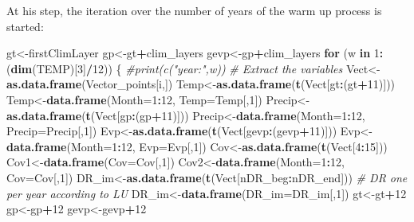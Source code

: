 \documentclass[
  10pt,
  b5paper,
]{book}
\newenvironment{Shaded}{\begin{snugshade}}{\end{snugshade}}
\newcommand{\CommentTok}[1]{\textcolor[rgb]{0.56,0.35,0.01}{\textit{#1}}}
\newcommand{\ControlFlowTok}[1]{\textcolor[rgb]{0.13,0.29,0.53}{\textbf{#1}}}
\newcommand{\DataTypeTok}[1]{\textcolor[rgb]{0.13,0.29,0.53}{#1}}
\newcommand{\DecValTok}[1]{\textcolor[rgb]{0.00,0.00,0.81}{#1}}
\newcommand{\KeywordTok}[1]{\textcolor[rgb]{0.13,0.29,0.53}{\textbf{#1}}}
\newcommand{\NormalTok}[1]{#1}
\newcommand{\OperatorTok}[1]{\textcolor[rgb]{0.81,0.36,0.00}{\textbf{#1}}}
\begin{document}
At his step, the iteration over the number of years of the warm up process is started:

\begin{Shaded}
\begin{Highlighting}[]
\NormalTok{gt<-firstClimLayer}
\NormalTok{gp<-gt}\OperatorTok{+}\NormalTok{clim_layers}
\NormalTok{gevp<-gp}\OperatorTok{+}\NormalTok{clim_layers}
\ControlFlowTok{for}\NormalTok{ (w }\ControlFlowTok{in} \DecValTok{1}\OperatorTok{:}\NormalTok{(}\KeywordTok{dim}\NormalTok{(TEMP)[}\DecValTok{3}\NormalTok{]}\OperatorTok{/}\DecValTok{12}\NormalTok{)) \{}
\CommentTok{#print(c("year:",w))}
\CommentTok{# Extract the variables }
\NormalTok{Vect<-}\KeywordTok{as.data.frame}\NormalTok{(Vector_points[i,])}
\NormalTok{Temp<-}\KeywordTok{as.data.frame}\NormalTok{(}\KeywordTok{t}\NormalTok{(Vect[gt}\OperatorTok{:}\NormalTok{(gt}\OperatorTok{+}\DecValTok{11}\NormalTok{)]))}
\NormalTok{Temp<-}\KeywordTok{data.frame}\NormalTok{(}\DataTypeTok{Month=}\DecValTok{1}\OperatorTok{:}\DecValTok{12}\NormalTok{, }\DataTypeTok{Temp=}\NormalTok{Temp[,}\DecValTok{1}\NormalTok{])}
\NormalTok{Precip<-}\KeywordTok{as.data.frame}\NormalTok{(}\KeywordTok{t}\NormalTok{(Vect[gp}\OperatorTok{:}\NormalTok{(gp}\OperatorTok{+}\DecValTok{11}\NormalTok{)]))}
\NormalTok{Precip<-}\KeywordTok{data.frame}\NormalTok{(}\DataTypeTok{Month=}\DecValTok{1}\OperatorTok{:}\DecValTok{12}\NormalTok{, }\DataTypeTok{Precip=}\NormalTok{Precip[,}\DecValTok{1}\NormalTok{])}
\NormalTok{Evp<-}\KeywordTok{as.data.frame}\NormalTok{(}\KeywordTok{t}\NormalTok{(Vect[gevp}\OperatorTok{:}\NormalTok{(gevp}\OperatorTok{+}\DecValTok{11}\NormalTok{)]))}
\NormalTok{Evp<-}\KeywordTok{data.frame}\NormalTok{(}\DataTypeTok{Month=}\DecValTok{1}\OperatorTok{:}\DecValTok{12}\NormalTok{, }\DataTypeTok{Evp=}\NormalTok{Evp[,}\DecValTok{1}\NormalTok{])}
\NormalTok{Cov<-}\KeywordTok{as.data.frame}\NormalTok{(}\KeywordTok{t}\NormalTok{(Vect[}\DecValTok{4}\OperatorTok{:}\DecValTok{15}\NormalTok{]))}
\NormalTok{Cov1<-}\KeywordTok{data.frame}\NormalTok{(}\DataTypeTok{Cov=}\NormalTok{Cov[,}\DecValTok{1}\NormalTok{])}
\NormalTok{Cov2<-}\KeywordTok{data.frame}\NormalTok{(}\DataTypeTok{Month=}\DecValTok{1}\OperatorTok{:}\DecValTok{12}\NormalTok{, }\DataTypeTok{Cov=}\NormalTok{Cov[,}\DecValTok{1}\NormalTok{])}
\NormalTok{DR_im<-}\KeywordTok{as.data.frame}\NormalTok{(}\KeywordTok{t}\NormalTok{(Vect[nDR_beg}\OperatorTok{:}\NormalTok{nDR_end])) }\CommentTok{# DR one per year according to LU}
\NormalTok{DR_im<-}\KeywordTok{data.frame}\NormalTok{(}\DataTypeTok{DR_im=}\NormalTok{DR_im[,}\DecValTok{1}\NormalTok{])}
\NormalTok{gt<-gt}\OperatorTok{+}\DecValTok{12}
\NormalTok{gp<-gp}\OperatorTok{+}\DecValTok{12}
\NormalTok{gevp<-gevp}\OperatorTok{+}\DecValTok{12}
\end{Highlighting}
\end{Shaded}
\end{document}

